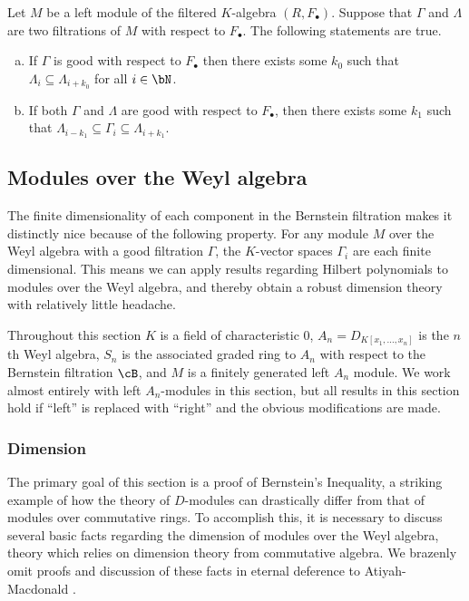 \begin{prop}\label{prop:compare-filtrations}
	Let $M$ be a left module of the filtered $K$-algebra $(R,F_\bullet)$. Suppose that $\Gamma$ and $\Lambda$ are two filtrations of $M$ with respect to $F_\bullet$. The following statements are true.
	\begin{enumerate}[(a)]
		\item If $\Gamma$ is good with respect to $F_\bullet$ then there exists some $k_0$ such that $\Lambda_i \subseteq \Lambda_{i+k_0}$ for all $i\in \bN$.
		\item If both $\Gamma$ and $\Lambda$ are good with respect to $F_\bullet$, then there exists some $k_1$ such that $\Lambda_{i-k_1}\subseteq \Gamma_i \subseteq \Lambda_{i+k_1}$.
	\end{enumerate}
\end{prop}
\begin{prf}
	\cite[Proposition 8.3.2]{d-mod-primer}
\end{prf}
\subsection{Modules over the Weyl algebra}
The finite dimensionality of each component in the Bernstein filtration makes it distinctly nice because of the following property. For any module $M$ over the Weyl algebra with a good filtration $\Gamma$, the $K$-vector spaces $\Gamma_i$ are each finite dimensional. This means we can apply results regarding Hilbert polynomials to modules over the Weyl algebra, and thereby obtain a robust dimension theory with relatively little headache.

Throughout this section $K$ is a field of characteristic $0$, $A_n = D_{K[x_1,...,x_n]}$ is the $n$th Weyl algebra, $S_n$ is the associated graded ring to $A_n$ with respect to the Bernstein filtration $\cB$, and $M$ is a finitely generated left $A_n$ module. We work almost entirely with left $A_n$-modules in this section, but all results in this section hold if ``left'' is replaced with ``right'' and the obvious modifications are made.

\subsubsection{Dimension}
The primary goal of this section is a proof of Bernstein's Inequality, a striking example of how the theory of $D$-modules can drastically differ from that of modules over commutative rings. To accomplish this, it is necessary to discuss several basic facts regarding the dimension of modules over the Weyl algebra, theory which relies on dimension theory from commutative algebra. We brazenly omit proofs and discussion of these facts in eternal deference to Atiyah-Macdonald \cite{am}.


